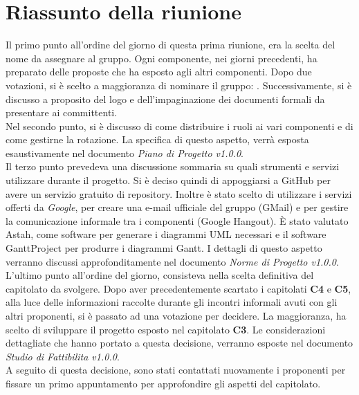 \section{Riassunto della riunione}
\label{riassunto}
Il primo punto all'ordine del giorno di questa prima riunione, era la scelta del nome da assegnare al gruppo. Ogni componente, nei giorni precedenti, ha preparato delle proposte che ha esposto agli altri componenti. Dopo due votazioni, si è scelto a maggioranza di nominare il gruppo: \authorName. Successivamente, si è discusso a proposito del logo e dell'impaginazione dei documenti formali da presentare ai committenti.
\\Nel secondo punto, si è discusso di come distribuire i ruoli ai vari componenti e di come gestirne la rotazione. La specifica di questo aspetto, verrà esposta esaustivamente nel documento \textit{Piano di Progetto v1.0.0}.
\\Il terzo punto prevedeva una discussione sommaria su quali strumenti e servizi utilizzare durante il progetto. Si è deciso quindi di appoggiarsi a GitHub\glossario{} per avere un servizio gratuito di repository\glossario{}. Inoltre è stato scelto di utilizzare i servizi offerti da \textit{Google}, per creare una e-mail ufficiale del gruppo (GMail) e per gestire la comunicazione informale tra i componenti (Google Hangout\glossario{}). \`E stato valutato Astah\glossario{}, come software per generare i diagrammi UML\glossario{} necessari e il software GanttProject\glossario{} per produrre i diagrammi Gantt\glossario{}. I dettagli di questo aspetto verranno discussi approfonditamente nel documento \textit{Norme di Progetto v1.0.0}.
\\L'ultimo punto all'ordine del giorno, consisteva nella scelta definitiva del capitolato da svolgere. Dopo aver precedentemente scartato i capitolati \textbf{C4} e \textbf{C5}, alla luce delle informazioni raccolte durante gli incontri informali avuti con gli altri proponenti, si è passato ad una votazione per decidere. La maggioranza, ha scelto di sviluppare il progetto esposto nel capitolato \textbf{C3}. Le considerazioni dettagliate che hanno portato a questa decisione, verranno esposte nel documento \textit{Studio di Fattibilita v1.0.0}.
\\A seguito di questa decisione, sono stati contattati nuovamente i proponenti per fissare un primo appuntamento per approfondire gli aspetti del capitolato.
